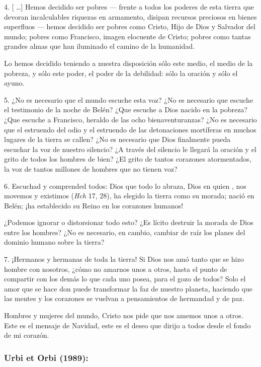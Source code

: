 \begin{body}
					4. {[} \ldots{}{]} Hemos decidido ser pobres --- frente a todos los poderes de esta tierra que devoran incalculables riquezas en armamento, disipan recursos preciosos en bienes superfluos --- hemos decidido ser pobres como Cristo, Hijo de Dios y Salvador del mundo; pobres como Francisco, imagen elocuente de Cristo; pobres como tantas grandes almas que han iluminado el camino de la humanidad.
					
					Lo hemos decidido teniendo a nuestra disposición sólo este medio, el medio de la pobreza, y sólo este poder, el poder de la debilidad: sólo la oración y sólo el ayuno.
					
					5. ¿No es necesario que el mundo escuche esta voz? ¿No es necesario que escuche el testimonio de la noche de Belén? ¿Que escuche a Dios nacido en la pobreza? ¿Que escuche a Francisco, heraldo de las ocho bienaventuranzas? ¿No es necesario que el estruendo del odio y el estruendo de las detonaciones mortíferas en muchos lugares de la tierra se callen? ¿No es necesario que Dios finalmente pueda escuchar la voz de nuestro silencio? ¿A través del silencio le llegará la oración y el grito de todos los hombres de bien? ¿El grito de tantos corazones atormentados, la voz de tantos millones de hombres que no tienen voz?
					
					6. Escuchad y comprended todos: Dios que todo lo abraza, Dios en quien , nos movemos y existimos (\emph{Hch} 17, 28), ha elegido la tierra como su morada; nació en Belén; ¡ha establecido su Reino en los corazones humanos!
					
					¿Podemos ignorar o distorsionar todo esto? ¿Es lícito destruir la morada de Dios entre los hombres? ¿No es necesario, en cambio, cambiar de raíz los planes del dominio humano sobre la tierra?
					
					7. ¡Hermanos y hermanas de toda la tierra! Si Dios nos amó tanto que se hizo hombre con nosotros, ¿cómo no amarnos unos a otros, hasta el punto de compartir con los demás lo que cada uno posea, para el gozo de todos? Solo el amor que se hace don puede transformar la faz de nuestro planeta, haciendo que las mentes y los corazones se vuelvan a pensamientos de hermandad y de paz.
					
					Hombres y mujeres del mundo, Cristo nos pide que nos amemos unos a otros. Este es el mensaje de Navidad, este es el deseo que dirijo a todos desde el fondo de mi corazón.
				\end{body}


			\subsubsection{Urbi et Orbi (1989):}

